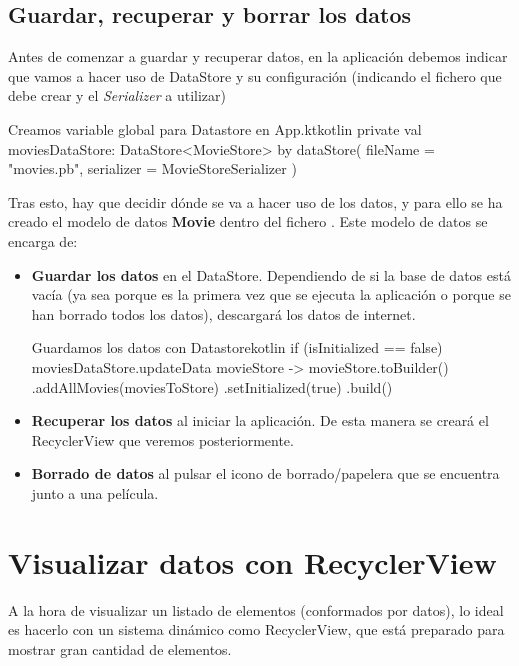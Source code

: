 \documentclass{\ClassPath/viu-tfm-template}
\begin{document}
\subsection{Guardar, recuperar y borrar los datos}

Antes de comenzar a guardar y recuperar datos, en la aplicación debemos indicar que vamos a hacer uso de DataStore y su configuración (indicando el fichero que debe crear y el \textit{Serializer} a utilizar)

\begin{mycode}{Creamos variable global para Datastore en App.kt}{kotlin}{}
private val moviesDataStore: DataStore<MovieStore> by dataStore(
    fileName = "movies.pb",
    serializer = MovieStoreSerializer
)
\end{mycode}

Tras esto, hay que decidir dónde se va a hacer uso de los datos, y para ello se ha creado el modelo de datos \textbf{Movie} dentro del fichero . Este modelo de datos se encarga de:

\begin{itemize}
    \item \textbf{Guardar los datos} en el DataStore. Dependiendo de si la base de datos está vacía (ya sea porque es la primera vez que se ejecuta la aplicación o porque se han borrado todos los datos), descargará los datos de internet.
\begin{mycode}{Guardamos los datos con Datastore}{kotlin}{}
if (isInitialized == false) {
    moviesDataStore.updateData { movieStore ->
        movieStore.toBuilder()
        .addAllMovies(moviesToStore)
        .setInitialized(true)
        .build()
    }
}
\end{mycode}
    \item \textbf{Recuperar los datos} al iniciar la aplicación. De esta manera se creará el RecyclerView que veremos posteriormente.

    \item \textbf{Borrado de datos} al pulsar el icono de borrado/papelera que se encuentra junto a una película.
\end{itemize}


\section{Visualizar datos con RecyclerView}

A la hora de visualizar un listado de elementos (conformados por datos), lo ideal es hacerlo con un sistema dinámico como RecyclerView, que está preparado para mostrar gran cantidad de elementos.
\end{document}
